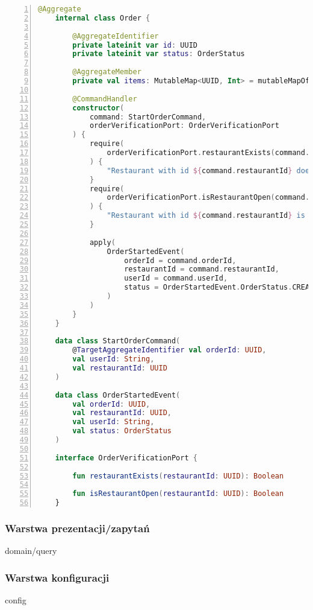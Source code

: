 \begin{lstlisting}[caption={Kod komponentów odpowiedzialnych za obsługę zamówień},label={lst:server-domain},captionpos=b,language=Kotlin,numbers=left]
    @Aggregate
    internal class Order {
    
        @AggregateIdentifier
        private lateinit var id: UUID
        private lateinit var status: OrderStatus
    
        @AggregateMember
        private val items: MutableMap<UUID, Int> = mutableMapOf()
    
        @CommandHandler
        constructor(
            command: StartOrderCommand,
            orderVerificationPort: OrderVerificationPort
        ) {
            require(
                orderVerificationPort.restaurantExists(command.restaurantId)
            ) {
                "Restaurant with id ${command.restaurantId} does not exist"
            }
            require(
                orderVerificationPort.isRestaurantOpen(command.restaurantId)
            ) {
                "Restaurant with id ${command.restaurantId} is closed"
            }
    
            apply(
                OrderStartedEvent(
                    orderId = command.orderId,
                    restaurantId = command.restaurantId,
                    userId = command.userId,
                    status = OrderStartedEvent.OrderStatus.CREATED
                )
            )
        }
    }

    data class StartOrderCommand(
        @TargetAggregateIdentifier val orderId: UUID,
        val userId: String,
        val restaurantId: UUID
    )

    data class OrderStartedEvent(
        val orderId: UUID,
        val restaurantId: UUID,
        val userId: String,
        val status: OrderStatus
    )

    interface OrderVerificationPort {

        fun restaurantExists(restaurantId: UUID): Boolean

        fun isRestaurantOpen(restaurantId: UUID): Boolean
    }

\end{lstlisting}


\subsubsection{Warstwa prezentacji/zapytań} domain/query

\subsubsection{Warstwa konfiguracji} config


